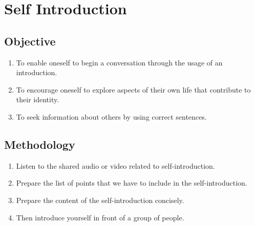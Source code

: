 \section{Self Introduction}

\subsection{Objective}

\begin{enumerate}
    \item To enable oneself to begin a conversation through the usage of an introduction.
    \item To encourage oneself to explore aspects of their own life that contribute to their identity.
    \item To seek information about others by using correct sentences.

\end{enumerate}

\subsection{Methodology}

\begin{enumerate}
    \item Listen to the shared audio or video related to self-introduction.
    \item Prepare the list of points that we have to include in the self-introduction.
    \item Prepare the content of the self-introduction concisely.
    \item Then introduce yourself in front of a group of people.
\end{enumerate}
